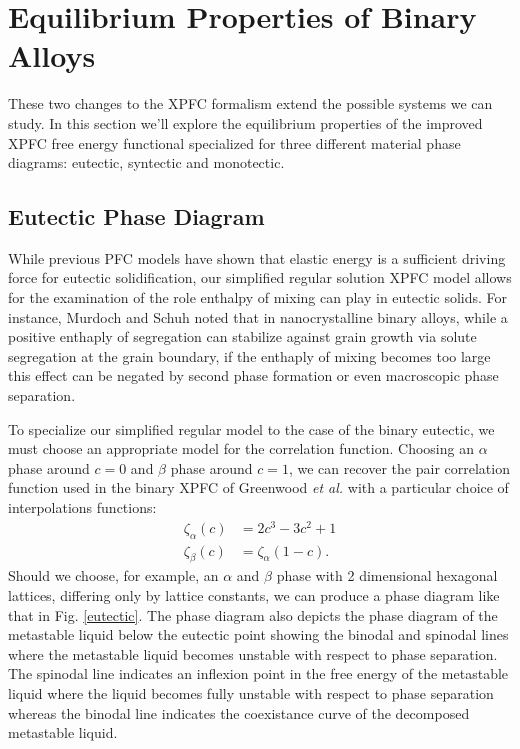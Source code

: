 \section{Equilibrium Properties of Binary Alloys} %

These two changes to the XPFC formalism extend the possible systems we can
study. In this section we'll explore the equilibrium properties of the improved
XPFC free energy functional specialized for three different material phase
diagrams: eutectic, syntectic and monotectic.

\subsection{Eutectic Phase Diagram} %

While previous PFC models have shown that elastic energy is a sufficient
driving force for eutectic solidification, our simplified regular solution XPFC
model allows for the examination of the role enthalpy of mixing can play in
eutectic solids.  For instance, Murdoch and Schuh noted that in nanocrystalline
binary alloys, while a positive enthaply of segregation can stabilize against
grain growth via solute segregation at the grain boundary, if the enthaply of
mixing becomes too large this effect can be negated by second phase formation
or even macroscopic phase separation\cite{MURDOCH13}. 

To specialize our simplified regular model to the case of the binary eutectic,
we must choose an appropriate model for the correlation function. Choosing an
$\alpha$ phase around $c = 0$ and $\beta$ phase around $c = 1$, we can recover
the pair correlation function used in the binary XPFC of Greenwood \textit{et
al.} with a particular choice of interpolations functions: 
%
\begin{align}
   \zeta_\alpha(c) &= 2c^3 - 3c^2 + 1 \\
   \zeta_\beta(c) &= \zeta_\alpha(1 - c).
\end{align}
%
Should we choose, for example, an $\alpha$ and $\beta$ phase with 2 dimensional
hexagonal lattices, differing only by lattice constants, we can produce a phase
diagram like that in Fig. \ref{eutectic}. The phase diagram also depicts the
phase diagram of the metastable liquid below the eutectic point showing the
binodal and spinodal lines where the metastable liquid becomes unstable with
respect to phase separation. The spinodal line indicates an inflexion point in
the free energy of the metastable liquid where the liquid becomes fully
unstable with respect to phase separation whereas the binodal line indicates
the coexistance curve of the decomposed metastable liquid.

